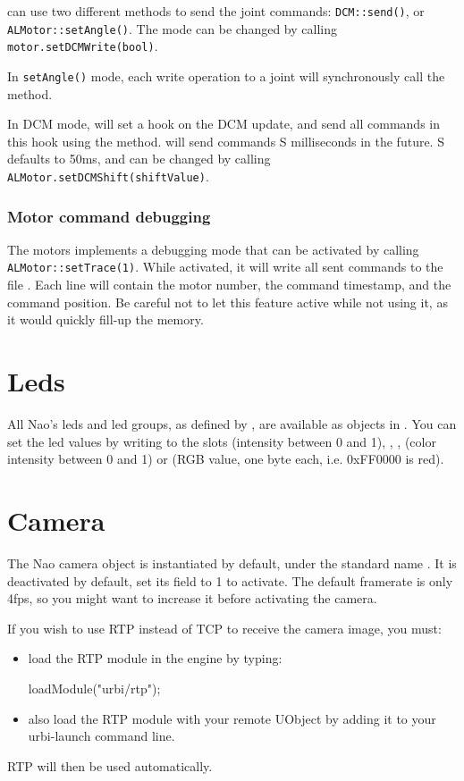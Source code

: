 \urbi can use two different methods to send the joint commands:
\lstinline|DCM::send()|, or \lstinline|ALMotor::setAngle()|.
The mode can be changed by calling \lstinline|motor.setDCMWrite(bool)|.

In \lstinline|setAngle()| mode, each write operation to a joint will
synchronously call the  \naoqi method.

In DCM mode, \urbi will set a hook on the DCM update, and send all
commands in this hook using the  method.  \urbi will
send commands S milliseconds in the future. S defaults to 50ms, and
can be changed by calling \lstinline|ALMotor.setDCMShift(shiftValue)|.

\subsubsection{Motor command debugging}

The motors implements a debugging mode that can be activated by
calling \lstinline|ALMotor::setTrace(1)|. While activated, it will
write all sent commands to the file . Each line will
contain the motor number, the command timestamp, and the command
position.  Be careful not to let this feature active while not using
it, as it would quickly fill-up the memory.

\section{Leds}

All Nao's leds and led groups, as defined by \naoqi, are available as
objects in \us. You can set the led values by writing to the slots
 (intensity between 0 and 1), , , 
(color intensity between 0 and 1) or  (RGB value, one byte
each, i.e. 0xFF0000 is red).

\section{Camera}

The Nao camera object is instantiated by default, under the standard name
. It is deactivated by default, set its  field to 1 to
activate. The default framerate is only 4fps, so you might want to increase it
before activating the camera.

If you wish to use RTP instead of TCP to receive the camera image, you must:
\begin{itemize}
\item load the RTP module in the engine by typing:
\begin{urbiunchecked}
loadModule("urbi/rtp");
\end{urbiunchecked}
\item also load the RTP module with your remote UObject by adding it to your
urbi-launch command line.
\end{itemize}
RTP will then be used automatically.

